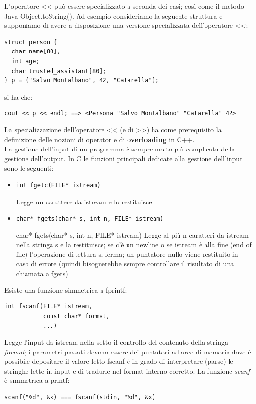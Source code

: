 \documentclass[a4paper,12pt, oneside]{book}
\begin{document}
	L'operatore << può essere specializzato a seconda dei casi;
	così come il metodo Java Object.toString(). Ad esempio consideriamo la seguente struttura e supponiamo
	di avere a disposizione una versione specializzata
	dell'operatore <<:
	\begin{verbatim}
struct person {
  char name[80];
  int age;
  char trusted_assistant[80];
} p = {"Salvo Montalbano", 42, "Catarella"};
\end{verbatim}
	si ha che:
	\begin{verbatim}
cout << p << endl; ==> <Persona "Salvo Montalbano" "Catarella" 42>
\end{verbatim}
	La specializzazione dell'operatore << (e di >>) ha come
	prerequisito la definizione delle nozioni di operator e di
	\textbf{overloading }in C++.\\
	La gestione dell'input di un programma è sempre molto più
	complicata della gestione dell'output. In C le funzioni principali dedicate alla gestione dell'input sono
	le seguenti:
	\begin{itemize}
		\item
		      \begin{verbatim}
int fgetc(FILE* istream)
\end{verbatim}
		      Legge un carattere da istream e lo restituisce
		\item
		      \begin{verbatim}
char* fgets(char* s, int n, FILE* istream)
\end{verbatim}
		      char* fgets(char* s, int n, FILE* istream)
		      Legge al più n caratteri da istream nella stringa s e la restituisce;
		      se c'è un newline o se istream è alla fine (end of file) l'operazione di lettura si ferma; un puntatore nullo viene restituito in caso di errore (quindi bisognerebbe sempre controllare il risultato di una chiamata a
		      fgets)
	\end{itemize}
	Esiste una funzione simmetrica a fprintf:
	\begin{verbatim}
int fscanf(FILE* istream,
           const char* format,
           ...)
\end{verbatim}
	Legge l'input da istream nella sotto il controllo del contenuto della stringa \textit{format}; i parametri passati devono essere dei puntatori ad
	aree di memoria dove è possibile depositare il valore letto
	fscanf è in grado di interpretare (parse) le stringhe lette in input e di tradurle nel format interno corretto. La funzione \textit{scanf} è simmetrica a printf:
	\begin{verbatim}
scanf("%d", &x) === fscanf(stdin, "%d", &x)
\end{verbatim}
\end{document}
